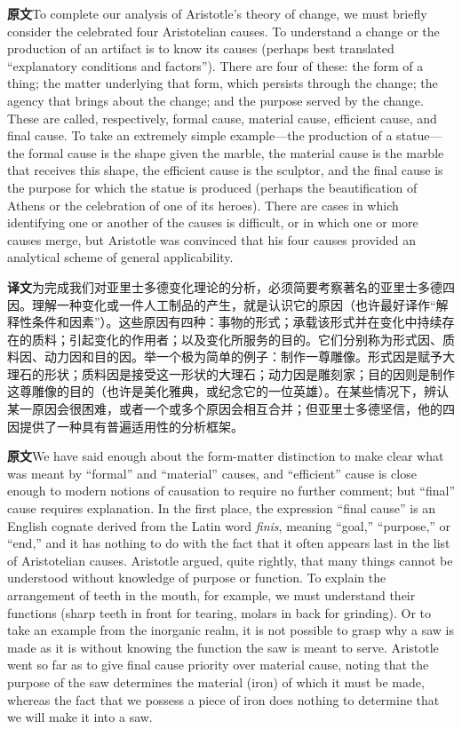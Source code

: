 \documentclass[UTF8,zihao=-4]{ctexart}
\newcommand{\BodyFont}{\fontsize{10.5pt}{15.5pt}\selectfont}
\newcommand{\origlabel}{\textbf{原文}\quad}
\newcommand{\translabel}{\textbf{译文}\quad}
\newcommand{\orig}{\par\noindent\begingroup\BodyFont\origlabel}
\newcommand{\zhline}[1]{\par\endgroup\noindent\begingroup\BodyFont\translabel #1\par\endgroup\vspace{0.35em}}
\begin{document}
\orig To complete our analysis of Aristotle's theory of change, we must briefly consider the celebrated four Aristotelian causes. To understand a change or the production of an artifact is to know its causes (perhaps best translated ``explanatory conditions and factors''). There are four of these: the form of a thing; the matter underlying that form, which persists through the change; the agency that brings about the change; and the purpose served by the change. These are called, respectively, formal cause, material cause, efficient cause, and final cause. To take an extremely simple example---the production of a statue---the formal cause is the shape given the marble, the material cause is the marble that receives this shape, the efficient cause is the sculptor, and the final cause is the purpose for which the statue is produced (perhaps the beautification of Athens or the celebration of one of its heroes). There are cases in which identifying one or another of the causes is difficult, or in which one or more causes merge, but Aristotle was convinced that his four causes provided an analytical scheme of general applicability.

\zhline{为完成我们对亚里士多德变化理论的分析，必须简要考察著名的亚里士多德四因。理解一种变化或一件人工制品的产生，就是认识它的原因（也许最好译作“解释性条件和因素”）。这些原因有四种：事物的形式；承载该形式并在变化中持续存在的质料；引起变化的作用者；以及变化所服务的目的。它们分别称为形式因、质料因、动力因和目的因。举一个极为简单的例子：制作一尊雕像。形式因是赋予大理石的形状；质料因是接受这一形状的大理石；动力因是雕刻家；目的因则是制作这尊雕像的目的（也许是美化雅典，或纪念它的一位英雄）。在某些情况下，辨认某一原因会很困难，或者一个或多个原因会相互合并；但亚里士多德坚信，他的四因提供了一种具有普遍适用性的分析框架。}

\orig We have said enough about the form-matter distinction to make clear what was meant by ``formal'' and ``material'' causes, and ``efficient'' cause is close enough to modern notions of causation to require no further comment; but ``final'' cause requires explanation. In the first place, the expression ``final cause'' is an English cognate derived from the Latin word \textit{finis}, meaning ``goal,'' ``purpose,'' or ``end,'' and it has nothing to do with the fact that it often appears last in the list of Aristotelian causes. Aristotle argued, quite rightly, that many things cannot be understood without knowledge of purpose or function. To explain the arrangement of teeth in the mouth, for example, we must understand their functions (sharp teeth in front for tearing, molars in back for grinding). Or to take an example from the inorganic realm, it is not possible to grasp why a saw is made as it is without knowing the function the saw is meant to serve. Aristotle went so far as to give final cause priority over material cause, noting that the purpose of the saw determines the material (iron) of which it must be made, whereas the fact that we possess a piece of iron does nothing to determine that we will make it into a saw.
\end{document}
